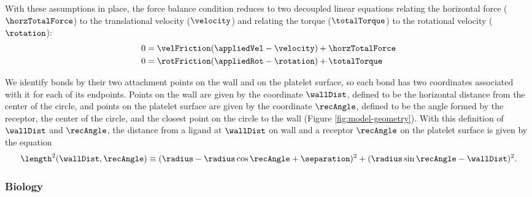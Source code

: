 With these assumptions in place, the force balance condition reduces
to two decoupled linear equations relating the horizontal force
($\horzTotalForce$) to the translational velocity ($\velocity$) and
relating the torque ($\totalTorque$) to the rotational velocity
($\rotation$):
\begin{align}
  \label{eq:force-bal}
  0 &= \velFriction(\appliedVel - \velocity) + \horzTotalForce \\
  \label{eq:torque-bal}
  0 &= \rotFriction(\appliedRot - \rotation) + \totalTorque
\end{align}

We identify bonds by their two attachment points on the wall and on
the platelet surface, so each bond has two coordinates associated with
it for each of its endpoints. Points on the wall are given by the
coordinate $\wallDist$, defined to be the horizontal distance from the
center of the circle, and points on the platelet surface are given by
the coordinate $\recAngle$, defined to be the angle formed by the
receptor, the center of the circle, and the closest point on the
circle to the wall (Figure \ref{fig:model-geometry}). With this
definition of $\wallDist$ and $\recAngle$, the distance from a ligand at
$\wallDist$ on wall and a receptor $\recAngle$ on the platelet surface is
given by the equation
\begin{equation}
  \label{eq:dim-length}
  \length^2 (\wallDist, \recAngle) \equiv (\radius - \radius\cos\recAngle +
  \separation)^2 + (\radius\sin\recAngle - \wallDist)^2.
\end{equation}

\subsubsection{Biology}
\label{sec:biology}

